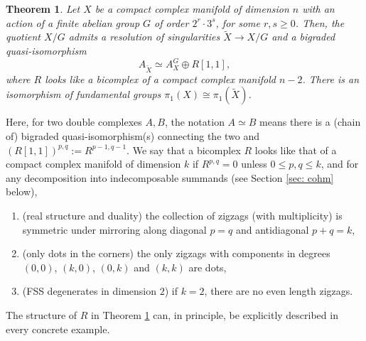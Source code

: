 \documentclass[12pt,reqno]{amsart}
\newtheorem{thmintro}{Theorem}
\theoremstyle{definition}
\begin{document}
\begin{thmintro}\label{thmintro: resolution}
Let $X$ be a compact complex manifold of dimension $n$ with an action of a finite abelian group $G$ of order $2^r\cdot 3^s$, for some $r,s\geq 0$. Then, the quotient $X/G$ admits a resolution of singularities $\tilde X\to X/G$ and a bigraded quasi-isomorphism 
\begin{equation}\label{eqn: A=AG+R}
    A_{\tilde X}\simeq A_X^G\oplus R[1,1],
\end{equation}
where $R$ looks like a bicomplex of a compact complex manifold $n-2$. 
There is an isomorphism of fundamental groups $\pi_1(X)\cong\pi_1(\tilde{X})$.
\end{thmintro}
Here, for two double complexes $A,B$, the notation $A\simeq B$ means there is a (chain of) bigraded quasi-isomorphism(s) connecting the two and $(R[1,1])^{p,q}:=R^{p-1,q-1}$. We say that a bicomplex $R$ looks like that of a compact complex manifold of dimension $k$ if $R^{p,q}=0$ unless $0\leq p,q\leq k$, and for any decomposition into indecomposable summands (see Section \ref{sec: cohm} below),
\begin{enumerate}
    \item (real structure and duality) the collection of zigzags (with multiplicity) is symmetric under mirroring along diagonal $p=q$ and antidiagonal $p+q=k$,
    \item (only dots in the corners) the only zigzags with components in degrees $(0,0)$, $(k,0)$, $(0,k)$ and $(k,k)$ are dots,
    \item (FSS degenerates in dimension $2$) if $k=2$, there are no even length zigzags.
\end{enumerate}

The structure of $R$ in Theorem \ref{thmintro: resolution} can, in principle, be explicitly described in every concrete example. 
\end{document}
